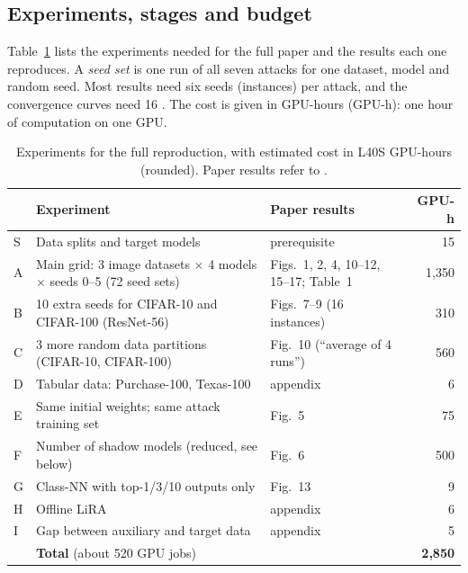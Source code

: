 \documentclass[a4paper]{article}
\begin{document}
\subsection{Experiments, stages and budget}
\label{subsec:budget}

Table~\ref{tab:experiments} lists the experiments needed for the full paper and the results each one reproduces.
A \emph{seed set} is one run of all seven attacks for one dataset, model and random seed.
Most results need six seeds (instances) per attack, and the convergence curves need 16 \citep[Figs.~7--9]{wang2025mia}.
The cost is given in GPU-hours (GPU-h): one hour of computation on one GPU.

\begin{table}[!htb]
  \centering
  \small
  \renewcommand{\arraystretch}{1.2}
  \begin{tabularx}{\textwidth}{@{}l X l r@{}}
    \toprule
    & Experiment & Paper results & GPU-h \\
    \midrule
    S & Data splits and target models & prerequisite & 15 \\
    A & Main grid: 3 image datasets $\times$ 4 models $\times$ seeds 0--5 (72 seed sets) & Figs.~1, 2, 4, 10--12, 15--17; Table~1 & 1{,}350 \\
    B & 10 extra seeds for CIFAR-10 and CIFAR-100 (ResNet-56) & Figs.~7--9 (16 instances) & 310 \\
    C & 3 more random data partitions (CIFAR-10, CIFAR-100) & Fig.~10 (``average of 4 runs'') & 560 \\
    D & Tabular data: Purchase-100, Texas-100 & appendix & 6 \\
    E & Same initial weights; same attack training set & Fig.~5 & 75 \\
    F & Number of shadow models (reduced, see below) & Fig.~6 & 500 \\
    G & Class-NN with top-1/3/10 outputs only & Fig.~13 & 9 \\
    H & Offline LiRA & appendix & 6 \\
    I & Gap between auxiliary and target data & appendix & 5 \\
    \midrule
    & \textbf{Total} (about 520 GPU jobs) & & \textbf{2{,}850} \\
    \bottomrule
  \end{tabularx}
  \caption{Experiments for the full reproduction, with estimated cost in L40S GPU-hours (rounded). Paper results refer to \citet{wang2025mia}.}
  \label{tab:experiments}
\end{table}
\end{document}
